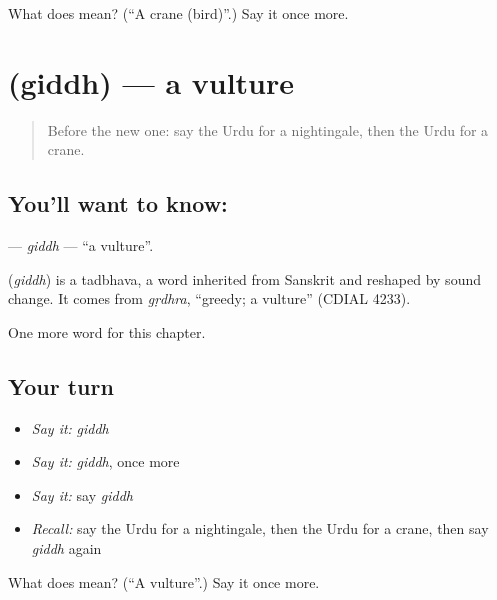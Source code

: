 \begin{tcolorbox}[breakable,colback=teal!4,colframe=teal!35!black,title={Before you move on}]
What does  mean? (\textquotedblleft{}A crane (bird)\textquotedblright{}.) Say it once more.
\end{tcolorbox}
\section[\texorpdfstring{\ur{گدھ} (giddh)}{گدھ (giddh)}]{ (giddh) — a vulture}

\label{lesson:UR-C208-giddh}



\begin{quote}
Before the new one: say the Urdu for a nightingale, then the Urdu for a crane.
\end{quote}

\subsection*{You'll want to know: }
\textbf{} — \emph{giddh} — \textquotedblleft{}a vulture\textquotedblright{}.

\begin{cousinweb}
\textbf{} (\emph{giddh}) is a tadbhava, a word inherited from Sanskrit and reshaped by sound change. It comes from \emph{gṛdhra}, \textquotedblleft{}greedy; a vulture\textquotedblright{} (CDIAL 4233).
\end{cousinweb}

\begin{grammarlens}[title={What you've built}]
One more word for this chapter.
\end{grammarlens}

\subsection*{Your turn}
\begin{itemize}
\raggedright
  \item \emph{Say it:} \emph{giddh}
  \item \emph{Say it:} \emph{giddh}, once more
  \item \emph{Say it:} say \emph{giddh}
  \item \emph{Recall:} say the Urdu for a nightingale, then the Urdu for a crane, then say \emph{giddh} again
\end{itemize}

\begin{tcolorbox}[breakable,colback=teal!4,colframe=teal!35!black,title={Before you move on}]
What does  mean? (\textquotedblleft{}A vulture\textquotedblright{}.) Say it once more.
\end{tcolorbox}
